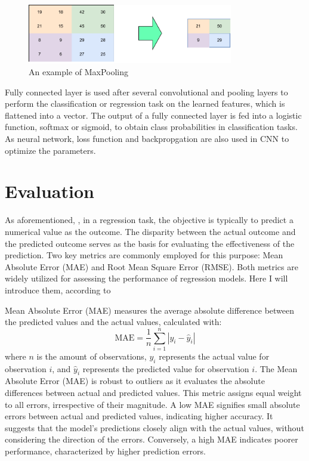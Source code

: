 \documentclass[12pt,a4paper,english
]{tunithesis}
\begin{document}
\begin{figure}
  \begin{center}
    \includegraphics[width=0.8\textwidth]{thesis/img/maxpooling.pdf}
  \end{center}
  \caption[MaxPooling]{An example of MaxPooling}
  \label{fig:maxpooling}
\end{figure}

Fully connected layer is used after several convolutional and pooling layers to perform the classification or regression task on the learned features, which is flattened into a vector. The output of a fully connected layer is fed into a logistic function, softmax or sigmoid, to obtain class probabilities in classification tasks. As neural network, loss function and backpropgation are also used in CNN to optimize the parameters.


\section{Evaluation}
As aforementioned, , in a regression task, the objective is typically to predict a numerical value as the outcome. The disparity between the actual outcome and the predicted outcome serves as the basis for evaluating the effectiveness of the prediction. Two key metrics are commonly employed for this purpose: Mean Absolute Error (MAE) and Root Mean Square Error (RMSE). Both metrics are widely utilized for assessing the performance of regression models. Here I will introduce them, according to \textcite{tyagi2022, chai2014}

Mean Absolute Error (MAE) measures the average absolute difference between the predicted values and the actual values, calculated with: 
\begin{equation}
    \mathrm{MAE}=\frac{1}{n} \sum_{i=1}^n\left|y_i-\hat{y}_i\right|
\end{equation}
where $n$ is the amount of observations, $y_i$ represents the actual value for observation $i$, and $\hat{y}_i$ represents the predicted value for observation $i$. The Mean Absolute Error (MAE) is robust to outliers as it evaluates the absolute differences between actual and predicted values. This metric assigns equal weight to all errors, irrespective of their magnitude. A low MAE signifies small absolute errors between actual and predicted values, indicating higher accuracy. It suggests that the model's predictions closely align with the actual values, without considering the direction of the errors. Conversely, a high MAE indicates poorer performance, characterized by higher prediction errors.
\end{document}
